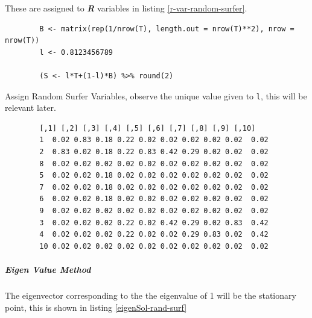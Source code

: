 \documentclass[11pt]{article}
\begin{document}
These are
assigned to \emph{\textbf{R}} variables in listing \ref{r-var-random-surfer}.

\begin{listing}[htbp]
    \begin{tcolorbox}
        \begin{verbatim}
        B <- matrix(rep(1/nrow(T), length.out = nrow(T)**2), nrow = nrow(T))
        l <- 0.8123456789

        (S <- l*T+(1-l)*B) %>% round(2)
        \end{verbatim}
        \caption{\label{r-var-random-surfer}Assign Random Surfer Variables, observe the unique value given to \texttt{l}, this will be relevant later.}
    \tcblower
        \begin{verbatim}
        [,1] [,2] [,3] [,4] [,5] [,6] [,7] [,8] [,9] [,10]
        1  0.02 0.83 0.18 0.22 0.02 0.02 0.02 0.02 0.02  0.02
        2  0.83 0.02 0.18 0.22 0.83 0.42 0.29 0.02 0.02  0.02
        8  0.02 0.02 0.02 0.02 0.02 0.02 0.02 0.02 0.02  0.02
        5  0.02 0.02 0.18 0.02 0.02 0.02 0.02 0.02 0.02  0.02
        7  0.02 0.02 0.18 0.02 0.02 0.02 0.02 0.02 0.02  0.02
        6  0.02 0.02 0.18 0.02 0.02 0.02 0.02 0.02 0.02  0.02
        9  0.02 0.02 0.02 0.02 0.02 0.02 0.02 0.02 0.02  0.02
        3  0.02 0.02 0.02 0.22 0.02 0.42 0.29 0.02 0.83  0.42
        4  0.02 0.02 0.02 0.22 0.02 0.02 0.29 0.83 0.02  0.42
        10 0.02 0.02 0.02 0.02 0.02 0.02 0.02 0.02 0.02  0.02
        \end{verbatim}
    \end{tcolorbox}
\end{listing}

\subparagraph{Eigen Value Method}
\label{eigen-value-method}
The eigenvector corresponding to the the eigenvalue of 1 will be the
stationary point, this is shown in listing \ref{eigenSol-rand-surf}
\end{document}
